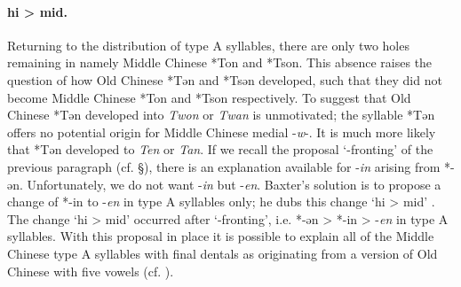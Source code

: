 \paragraph{hi \textgreater{} mid.}
Returning to the distribution of type A syllables, there are only two
holes remaining in namely Middle Chinese *Ton and *Tson. This absence
raises the question of how Old Chinese *Tən and *Tsən developed, such
that they did not become Middle Chinese *Ton and *Tson respectively. To
suggest that Old Chinese *Tən developed into  \emph{Twon} or \emph{Twan}
is unmotivated; the syllable *Tən offers no potential origin for Middle
Chinese medial -\emph{w}-. It is much more likely that *Tən developed to
 \emph{Ten} or \emph{Tan}. If we recall the proposal `{}-fronting' of the
previous paragraph (cf. §), there is an explanation available for
-\emph{in} arising from *-ən. Unfortunately, we do not want -\emph{in}
but -\emph{en}. Baxter's solution is to propose a change of *-in to
-\emph{en} in type A syllables only; he dubs this change `hi
\textgreater{} mid' 
\citep[578]{Baxter1992}. The change `hi \textgreater{} mid'
occurred after `{}-fronting', i.e. *-ən \textgreater{} *-in
\textgreater{} -\emph{en} in type A syllables. With this proposal in
place it is possible to explain all of the Middle Chinese type A
syllables with final dentals as originating from a version of Old
Chinese with five vowels (cf. ).

